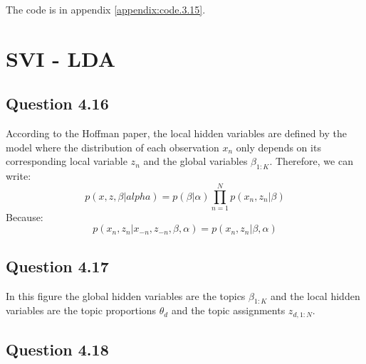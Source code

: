 \documentclass{article}
\begin{document}
The code is in appendix \ref{appendix:code.3.15}.

\section{SVI - LDA}

\subsection*{Question 4.16}

According to the Hoffman paper, the local hidden variables are defined by the model where the distribution of each observation $x_n$ only depends on its corresponding local variable $z_n$ and the global variables $\beta_{1:K}$.
Therefore, we can write:
\begin{equation}
    p(x, z, \beta | alpha) = p(\beta | \alpha) \prod_{n=1}^{N}p(x_n, z_n | \beta)
\end{equation}
Because:
\begin{equation}
    p(x_n, z_n | x_{-n}, z_{-n}, \beta, \alpha) = p(x_n, z_n | \beta, \alpha)
\end{equation}

\subsection*{Question 4.17}

In this figure the global hidden variables are the topics $\beta_{1:K}$ and the local hidden variables are the topic proportions $\theta_d$ and the topic assignments $z_{d,1:N}$.

\subsection*{Question 4.18}
\end{document}
